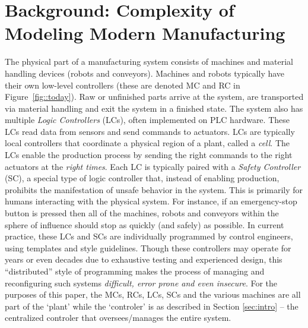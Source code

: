 \section{Background: Complexity of Modeling Modern Manufacturing}
\label{sec::background}

The physical part of a manufacturing system consists of machines and material handling devices (\eg robots and
conveyors). Machines and robots typically have their own low-level controllers (these are denoted MC and RC in Figure~\ref{fig::today}). Raw or unfinished parts arrive at the
system, are transported via material handling and exit the system in a
finished state. 
%
The system also has  multiple {\em Logic
Controllers} (LCs), often implemented on PLC hardware. These LCs read data
from sensors and send commands to actuators. LCs are typically local
controllers that coordinate a physical region of a plant, called a {\em cell}.
The LCs enable the production process by sending the right commands  to the
right actuators at the {\em right times}. Each LC is typically paired with a
{\em Safety Controller} (SC), a special type of logic controller that, instead
of enabling production, prohibits the manifestation of unsafe behavior in the
system. This is primarily for humans interacting with the physical system. For
instance, if an emergency-stop button is pressed then all of the machines,
robots and conveyors within the sphere of influence should stop as quickly (and
safely) as possible. In current practice, these LCs and SCs are individually programmed by
control engineers, using templates and style guidelines. Though these
controllers may operate for years or even decades due to exhaustive testing and
experienced design, this ``distributed'' style of programming  makes the
process of managing and reconfiguring such systems {\em difficult, error prone and even
insecure}. For the purposes of this paper, the MCs, RCs, LCs, SCs
and the various machines are all part of the `plant' while the `controler' is as
described in Section \ref{sec:intro} -- the centralized controler that oversees/manages 
the entire system. 

